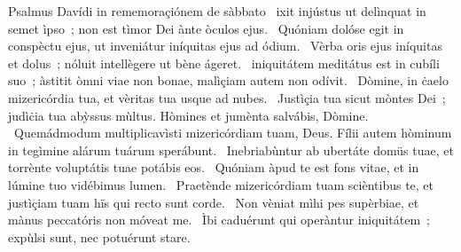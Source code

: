 { Psalmus Davídi in rememoraçiónem de sàbbato}
{%
~ixit injústus ut delìnquat in semet ìpso~; non est tìmor Dei ànte òculos ejus. 
~Quóniam dolóse egit in conspèctu ejus, ut inveniátur iníquitas ejus ad ódium. 
~Vèrba oris ejus iníquitas et dolus~; nóluit intellègere ut bène ágeret. 
~iniquitátem meditátus est in cubíli suo~; àstitit òmni viae non bonae, malìçiam autem non odívit. 
~Dòmine, in ċaelo mizericórdia tua, et vèritas tua usque ad nubes. 
~Justìçia tua sicut mòntes Dei~; judìċia tua abỳssus mùltus. Hòmines et jumènta salvábis, Dòmine. 
~Quemádmodum multiplicavìsti mizericórdiam tuam, Deus. Fílii autem hòminum in tegìmine alárum tuárum sperábunt. 
~Inebriabùntur ab ubertáte domüs tuae, et torrènte voluptátis tuae potábis eos. 
~Quóniam àpud te est fons vitae, et in lúmine tuo vidébimus lumen. 
~Praetènde mizericórdiam tuam scièntibus te, et justìçiam tuam hïs qui recto sunt corde. 
~Non vèniat mìhi pes supèrbiae, et mànus peccatóris non móveat me. 
~Ìbi caduérunt qui operàntur iniquitátem~; expùlsi sunt, nec potuérunt stare. 
}
